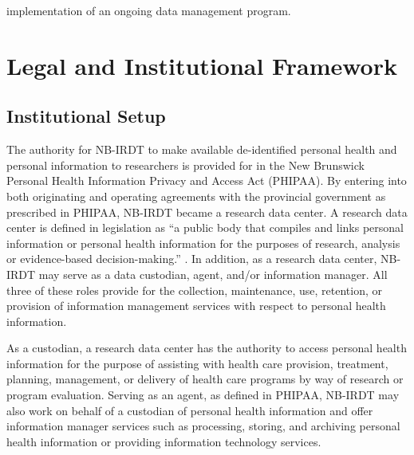 implementation of an ongoing data management program.

\hypertarget{nbirdt-framework}{%
\section{Legal and Institutional Framework}\label{nbirdt-framework}}

\hypertarget{nbirdt-institutionalsetup}{%
\subsection{Institutional Setup}\label{nbirdt-institutionalsetup}}

The authority for NB-IRDT to make available de-identified personal health and personal information to researchers is provided for in the New Brunswick Personal Health Information Privacy and Access Act (PHIPAA). By entering into both originating and operating agreements with the provincial government as prescribed in PHIPAA, NB-IRDT became a research data center. A research data center is defined in legislation as ``a public body that compiles and links personal information or personal health information for the purposes of research, analysis or evidence-based decision-making.'' \citep{governmentofnewbrunswick2009}. In addition, as a research data center, NB-IRDT may serve as a data custodian, agent, and/or information manager. All three of these roles provide for the collection, maintenance, use, retention, or provision of information management services with respect to personal health information.

As a custodian, a research data center has the authority to access personal health information for the purpose of assisting with health care provision, treatment, planning, management, or delivery of health care programs by way of research or program evaluation. Serving as an agent, as defined in PHIPAA, NB-IRDT may also work on behalf of a custodian of personal health information and offer information manager services such as processing, storing, and archiving personal health information or providing information technology services.

